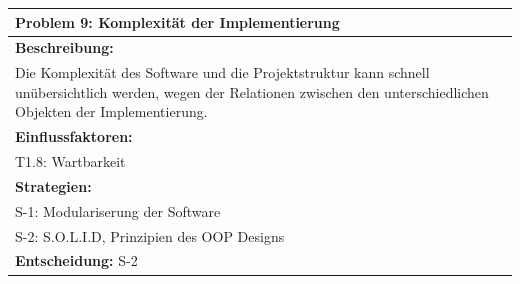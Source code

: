\documentclass[fontsize=12pt,paper=a4,twoside]{scrartcl}
\begin{document}
\begin{longtable}{|p{15cm}|}
\hline
Problem 9: Komplexität der Implementierung                                                                       
\\ \hline                                                                                                                                                                                                                                                                                                                                                                                                                                                                                                                                                        
\textbf{Beschreibung:} \\
Die Komplexität des Software und die Projektstruktur kann schnell unübersichtlich werden, wegen der Relationen zwischen den unterschiedlichen Objekten der Implementierung.
\\ \hline
\textbf{Einflussfaktoren:} \\
T1.8: Wartbarkeit
\\ \hline
\textbf{Strategien:} \\
S-1: Modulariserung der Software \\
S-2: S.O.L.I.D, Prinzipien des OOP Designs
 \\ \hline
 \textbf{Entscheidung:} S-2
\\ \hline
\end{longtable}
\end{document}
